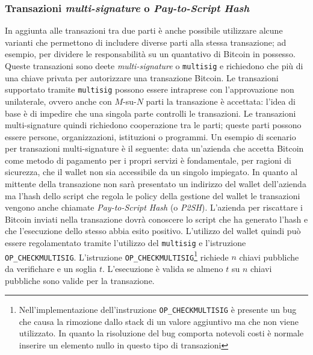 \begin{enumerate}[1.]
\subsubsection{Transazioni \textit{multi-signature} o \textit{Pay-to-Script Hash}}
In aggiunta alle transazioni tra due parti è anche possibile utilizzare alcune varianti che permettono di includere diverse parti alla stessa transazione; ad esempio, per dividere le responsabilità su un quantativo di Bitcoin in possesso. Queste transazioni sono deete \textit{multi-signature} o \texttt{multisig} e richiedono che più di una chiave privata per autorizzare una transazione Bitcoin. Le transazioni supportato tramite \texttt{multisig} possono essere intraprese con l'approvazione non unilaterale, ovvero anche con $M$-su-$N$ parti la transazione è accettata: l'idea di base è di impedire che una singola parte controlli le transazioni. Le transazioni multi-signature quindi richiedono cooperazione tra le parti; queste parti possono essere persone, organizzazioni, istituzioni o programmi.\newline
Un esempio di scenario per transazioni multi-signature è il seguente: data un'azienda che accetta Bitcoin come metodo di pagamento per i propri servizi è fondamentale, per ragioni di sicurezza, che il wallet non sia accessibile da un singolo impiegato. In quanto al mittente della transazione non sarà presentato un indirizzo del wallet dell'azienda ma l'hash dello script che regola le policy della gestione del wallet le transazioni vengono anche chiamate \textit{Pay-to-Script Hash} (o \textit{P2SH}). L'azienda per riscattare i Bitcoin inviati nella transazione dovrà conoscere lo script che ha generato l'hash e che l'esecuzione dello stesso abbia esito positivo.
L'utilizzo del wallet quindi può essere regolamentato tramite l'utilizzo del \texttt{multisig} e l'istruzione \texttt{OP\_CHECKMULTISIG}.\newline
L'istruzione \texttt{OP\_CHECKMULTISIG}\footnote{Nell'implementazione dell'instruzione \texttt{OP\_CHECKMULTISIG} è presente un bug che causa la rimozione dallo stack di un valore aggiuntivo ma che non viene utilizzato. In quanto la risoluzione del bug comporta notevoli costi è normale inserire un elemento nullo in questo tipo di transazioni} richiede $n$ chiavi pubbliche da verifichare e un soglia $t$. L'esecuzione è valida se almeno $t$ su $n$ chiavi pubbliche sono valide per la transazione.\newline


\end{enumerate}
